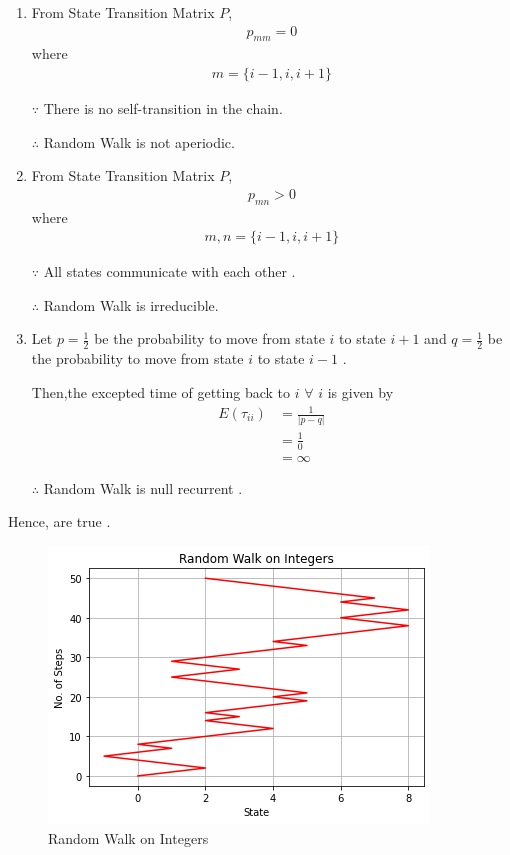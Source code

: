 \begin{enumerate}
    \item From State Transition Matrix $P$,
      \begin{align}
        p_{mm} = 0
    \end{align}
    where
    \begin{align}
        m=\{i-1,i,i+1\} 
    \end{align}
    
    $\because$ There is no self-transition in the chain.
    
    $\therefore$ Random Walk is not aperiodic.

    \item From State Transition Matrix $P$,
    \begin{align}
        p_{mn} > 0  
    \end{align}
    where
    \begin{align}
        m,n=\{i-1,i,i+1\} 
    \end{align}
     
    $\because$ All states communicate with each other .

    $\therefore$ Random Walk is irreducible.

    \item Let $p=\frac{1}{2}$ be the probability to move from state $i$ to state $i+1$ and $q=\frac{1}{2}$ be the probability to move from state $i$ to state $i-1$ .

    Then,the excepted time of getting back to $i$ $\forall$ $i$ is given by 
    \begin{align}
       E(\tau_{ii}) &= \frac{1}{|p-q|} \\
       &=\frac{1}{0} \\
       &= \infty
    \end{align}

    $\therefore$ Random Walk is null recurrent .

\end{enumerate}

Hence,  are true .


\begin{figure}[!ht]
\centering
\includegraphics[width=\columnwidth]{markov/solutions/8/Figure18.png}
\caption{Random Walk on Integers}
\label{markov/8/Random Walk}	
\end{figure}




